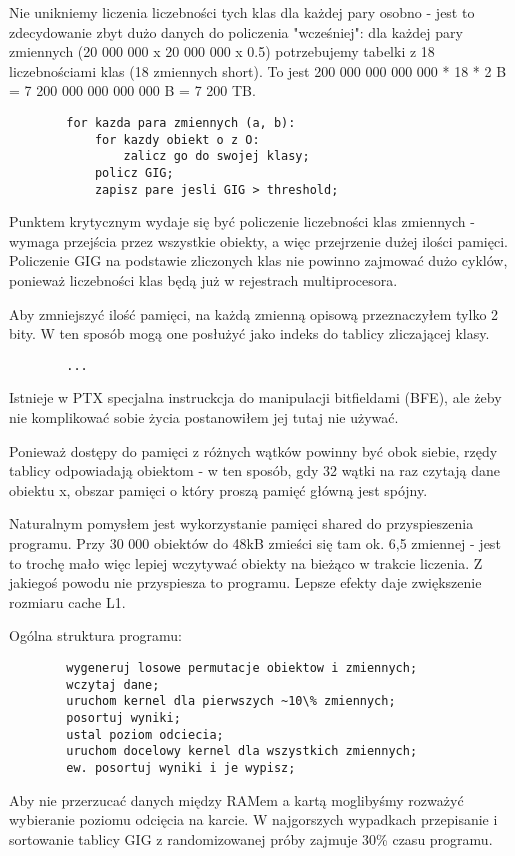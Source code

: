 \documentclass[a4paper]{article}
\begin{document}
    Nie unikniemy liczenia liczebności tych klas dla każdej pary osobno - jest to zdecydowanie zbyt dużo danych do policzenia "wcześniej": dla każdej pary zmiennych (20 000 000 x 20 000 000 x 0.5) potrzebujemy tabelki z 18 liczebnościami klas (18 zmiennych short). To jest 200 000 000 000 000 * 18 * 2 B = 7 200 000 000 000 000 B = 7 200 TB.

    \begin{lstlisting}
        for kazda para zmiennych (a, b):
            for kazdy obiekt o z O:
                zalicz go do swojej klasy;
            policz GIG;
            zapisz pare jesli GIG > threshold;
    \end{lstlisting}

    Punktem krytycznym wydaje się być policzenie liczebności klas zmiennych - wymaga przejścia przez wszystkie obiekty, a więc przejrzenie dużej ilości pamięci. Policzenie GIG na podstawie zliczonych klas nie powinno zajmować dużo cyklów, ponieważ liczebności klas będą już w rejestrach multiprocesora.

    Aby zmniejszyć ilość pamięci, na każdą zmienną opisową przeznaczyłem tylko 2 bity. W ten sposób mogą one posłużyć jako indeks do tablicy zliczającej klasy.

    \begin{lstlisting}
        ...
    \end{lstlisting}

    Istnieje w PTX specjalna instruckcja do manipulacji bitfieldami (BFE), ale żeby nie komplikować sobie życia postanowiłem jej tutaj nie używać.

    Ponieważ dostępy do pamięci z różnych wątków powinny być obok siebie, rzędy tablicy odpowiadają obiektom - w ten sposób, gdy 32 wątki na raz czytają dane obiektu x, obszar pamięci o który proszą pamięć główną jest spójny.

    Naturalnym pomysłem jest wykorzystanie pamięci shared do przyspieszenia programu. Przy 30 000 obiektów do 48kB zmieści się tam ok. 6,5 zmiennej - jest to trochę mało więc lepiej wczytywać obiekty na bieżąco w trakcie liczenia. Z jakiegoś powodu nie przyspiesza to programu. Lepsze efekty daje zwiększenie rozmiaru cache L1.


    Ogólna struktura programu:
    \begin{lstlisting}
        wygeneruj losowe permutacje obiektow i zmiennych;
        wczytaj dane;
        uruchom kernel dla pierwszych ~10\% zmiennych;
        posortuj wyniki;
        ustal poziom odciecia;
        uruchom docelowy kernel dla wszystkich zmiennych;
        ew. posortuj wyniki i je wypisz;
    \end{lstlisting} 
    Aby nie przerzucać danych między RAMem a kartą moglibyśmy rozważyć wybieranie poziomu odcięcia na karcie. W najgorszych wypadkach przepisanie i sortowanie tablicy GIG z randomizowanej próby zajmuje 30\% czasu programu.
\end{document}
